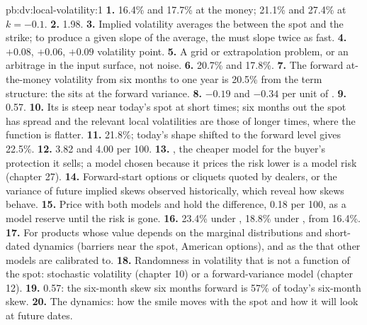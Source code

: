 \begin{solution}{pb:dv:local-volatility:1}
\textbf{1.} 16.4\% and 17.7\% at the money; 21.1\% and 27.4\% at $k=-0.1$.
\textbf{2.} 1.98.
\textbf{3.} Implied volatility averages the  between the spot and the strike; to produce a given
slope of the average, the  must slope twice as fast.
\textbf{4.} $+0.08$, $+0.06$, $+0.09$ volatility point.
\textbf{5.} A grid or extrapolation problem, or an arbitrage in the input surface, not noise.
\textbf{6.} 20.7\% and 17.8\%.
\textbf{7.} The forward at-the-money volatility from six months to one year is 20.5\% from the term structure: the
 sits at the forward variance.
\textbf{8.} $-0.19$ and $-0.34$ per unit of .
\textbf{9.} 0.57.
\textbf{10.} Its  is steep near today's spot at short times; six months out the spot has spread and
the relevant local volatilities are those of longer times, where the function is flatter.
\textbf{11.} 21.8\%; today's shape shifted to the forward level gives 22.5\%.
\textbf{12.} 3.82 and 4.00 per 100.
\textbf{13.} , the cheaper model for the buyer's protection it sells; a model chosen because it prices
the risk lower is a model risk (chapter 27).
\textbf{14.} Forward-start options or cliquets quoted by dealers, or the variance of future implied skews observed
historically, which reveal how skews behave.
\textbf{15.} Price with both models and hold the difference, 0.18 per 100, as a model reserve until the risk is gone.
\textbf{16.} 23.4\% under , 18.8\% under , from 16.4\%.
\textbf{17.} For products whose value depends on the marginal distributions and short-dated dynamics (barriers near
the spot, American options), and as the  that other models are calibrated to.
\textbf{18.} Randomness in volatility that is not a function of the spot: stochastic volatility (chapter 10) or a
forward-variance model (chapter 12).
\textbf{19.} 0.57: the six-month skew six months forward is 57\% of today's six-month skew.
\textbf{20.} The dynamics: how the smile moves with the spot and how it will look at future dates.
\end{solution}

